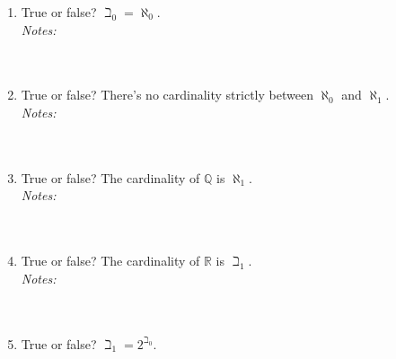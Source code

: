 \documentclass[justified]{tufte-handout}
\begin{document}
\begin{enumerate}[label=\roman*.]
\item True or false? $\beth_0=\aleph_0$.\\

\noindent \emph{Notes:}  \underline{\hspace{15.4cm}}\\\\\underline{\hspace{16.43cm}}\\

\item True or false? There's no cardinality strictly between $\aleph_0$ and $\aleph_1$.\\

\noindent \emph{Notes:}  \underline{\hspace{15.4cm}}\\\\\underline{\hspace{16.43cm}}\\

\item True or false? The cardinality of $\mathbb{Q}$ is $\aleph_1$.\\

\noindent \emph{Notes:}  \underline{\hspace{15.4cm}}\\\\\underline{\hspace{16.43cm}}\\

\item True or false? The cardinality of $\mathbb{R}$ is $\beth_1$.\\

\noindent \emph{Notes:}  \underline{\hspace{15.4cm}}\\\\\underline{\hspace{16.43cm}}\\

\item True or false? $\beth_1=2^{\beth_0}$.\\


\end{enumerate}
\end{document}
